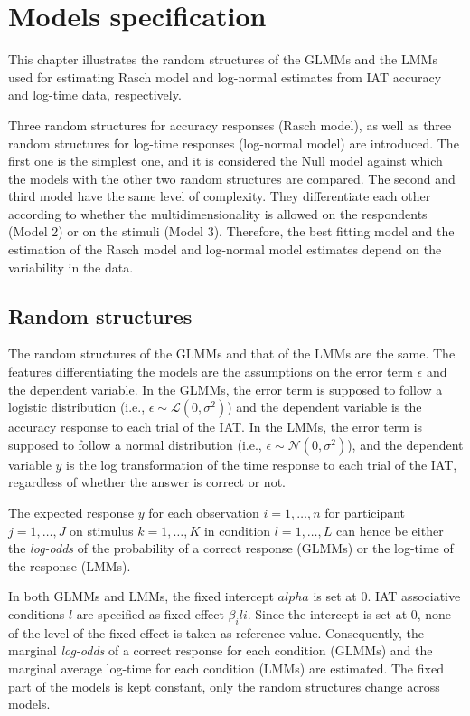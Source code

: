 \documentclass{book}
\begin{document}
\chapter{Models specification}\label{chap:modelsIAT}

This chapter illustrates the random structures of the GLMMs and the LMMs used for estimating Rasch model and log-normal estimates from IAT accuracy and log-time data, respectively. 

Three random structures for accuracy responses (Rasch model), as well as three random structures for log-time responses (log-normal model) are introduced. The first one is the simplest one, and it is considered the Null model against which the models with the other two random structures are compared. The second and third model have the same level of complexity. They differentiate each other according to whether the multidimensionality is allowed on the respondents (Model 2) or on the stimuli (Model 3). Therefore, the best fitting model and the estimation of the Rasch model and log-normal model estimates depend on the variability in the data. 


\newpage

\section{Random structures}
The random structures of the GLMMs and that of the LMMs are the same. The features differentiating the models are the assumptions on the error term $\epsilon$ and the dependent variable. 
In the GLMMs, the error term is supposed to follow a logistic distribution (i.e., $\epsilon \sim \mathcal{L}(0, \sigma^2)$) and the dependent variable is the accuracy response to each trial of the IAT. 
In the LMMs, the error term is supposed to follow a normal distribution (i.e., $\epsilon \sim \mathcal{N}(0, \sigma^2)$), and the dependent variable $y$ is the log transformation of the time response to each trial of the IAT, regardless of whether the answer is correct or not.

The expected response $y$ for each observation $i = 1, \ldots, n$  for participant $j = 1,\ldots, J$ on stimulus $k = 1,\ldots, K$ in condition $l= 1,\ldots, L$ can hence be either the \emph{log-odds} of the probability of a correct response (GLMMs) or the log-time of the response (LMMs).

In both GLMMs and LMMs, the fixed intercept $alpha$ is set at $0$. IAT associative conditions $l$ are specified as fixed effect $\beta_ili$. Since the intercept is set at $0$, none of the level of the fixed effect is taken as reference value. Consequently, the marginal \emph{log-odds} of a correct response for each condition (GLMMs) and the marginal average log-time for each condition (LMMs) are estimated.
The fixed part of the models is kept constant, only the random structures change across models.
\end{document}

